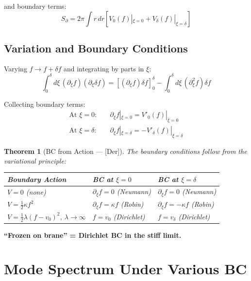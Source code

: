 \documentclass[11pt,a4paper]{article}
\newtheorem{theorem}{Theorem}
\begin{document}
and boundary terms:
\begin{equation}
S_{\partial} = 2\pi \int r\,dr \left[ V_0(f)|_{\xi=0} + V_\delta(f)|_{\xi=\delta} \right]
\end{equation}

\subsection{Variation and Boundary Conditions}

Varying $f \to f + \delta f$ and integrating by parts in $\xi$:
\begin{equation}
\int_0^\delta d\xi\, (\partial_\xi f)(\partial_\xi \delta f) =
[(\partial_\xi f)\delta f]_0^\delta - \int_0^\delta d\xi\, (\partial_\xi^2 f)\delta f
\end{equation}

Collecting boundary terms:
\begin{align}
\text{At } \xi = 0: \quad & \partial_\xi f|_{\xi=0} = V'_0(f)|_{\xi=0} \\
\text{At } \xi = \delta: \quad & \partial_\xi f|_{\xi=\delta} = -V'_\delta(f)|_{\xi=\delta}
\end{align}

\begin{theorem}[BC from Action --- \textnormal{[Der]}]
\label{thm:bc-from-action}
The boundary conditions follow from the variational principle:
\begin{center}
\begin{tabular}{@{}lll@{}}
\toprule
Boundary Action & BC at $\xi = 0$ & BC at $\xi = \delta$ \\
\midrule
$V = 0$ (none) & $\partial_\xi f = 0$ (Neumann) & $\partial_\xi f = 0$ (Neumann) \\
$V = \frac{1}{2}\kappa f^2$ & $\partial_\xi f = \kappa f$ (Robin) & $\partial_\xi f = -\kappa f$ (Robin) \\
$V = \frac{1}{2}\lambda(f-v_0)^2$, $\lambda\to\infty$ & $f = v_0$ (Dirichlet) & $f = v_\delta$ (Dirichlet) \\
\bottomrule
\end{tabular}
\end{center}
\end{theorem}

\textbf{``Frozen on brane'' = Dirichlet BC in the stiff limit.}

\section{Mode Spectrum Under Various BC}
\label{sec:mode-spectrum}
\end{document}
